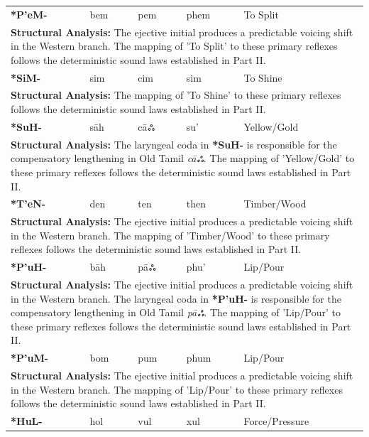 \begin{longtable}{p{} p{} p{} p{} p{}}
\textbf{*P'eM-} & bem & pem & phem & To Split \\ 
\multicolumn{5}{p{\textwidth}}{\small \textbf{Structural Analysis:} The ejective initial produces a predictable voicing shift in the Western branch. The mapping of 'To Split' to these primary reflexes follows the deterministic sound laws established in Part II.} \\ \addlinespace[15pt] 
\textbf{*SiM-} & sim & cim & sim & To Shine \\ 
\multicolumn{5}{p{\textwidth}}{\small \textbf{Structural Analysis:}  The mapping of 'To Shine' to these primary reflexes follows the deterministic sound laws established in Part II.} \\ \addlinespace[15pt] 
\textbf{*SuH-} & sāh & cāஃ & su' & Yellow/Gold \\ 
\multicolumn{5}{p{\textwidth}}{\small \textbf{Structural Analysis:} The laryngeal coda in \textbf{*SuH-} is responsible for the compensatory lengthening in Old Tamil \textit{cāஃ}. The mapping of 'Yellow/Gold' to these primary reflexes follows the deterministic sound laws established in Part II.} \\ \addlinespace[15pt] 
\textbf{*T'eN-} & den & ten & then & Timber/Wood \\ 
\multicolumn{5}{p{\textwidth}}{\small \textbf{Structural Analysis:} The ejective initial produces a predictable voicing shift in the Western branch. The mapping of 'Timber/Wood' to these primary reflexes follows the deterministic sound laws established in Part II.} \\ \addlinespace[15pt] 
\textbf{*P'uH-} & bāh & pāஃ & phu' & Lip/Pour \\ 
\multicolumn{5}{p{\textwidth}}{\small \textbf{Structural Analysis:} The ejective initial produces a predictable voicing shift in the Western branch. The laryngeal coda in \textbf{*P'uH-} is responsible for the compensatory lengthening in Old Tamil \textit{pāஃ}. The mapping of 'Lip/Pour' to these primary reflexes follows the deterministic sound laws established in Part II.} \\ \addlinespace[15pt] 
\textbf{*P'uM-} & bom & pum & phum & Lip/Pour \\ 
\multicolumn{5}{p{\textwidth}}{\small \textbf{Structural Analysis:} The ejective initial produces a predictable voicing shift in the Western branch. The mapping of 'Lip/Pour' to these primary reflexes follows the deterministic sound laws established in Part II.} \\ \addlinespace[15pt] 
\textbf{*HuL-} & hol & vul & xul & Force/Pressure \\ 

\end{longtable}
